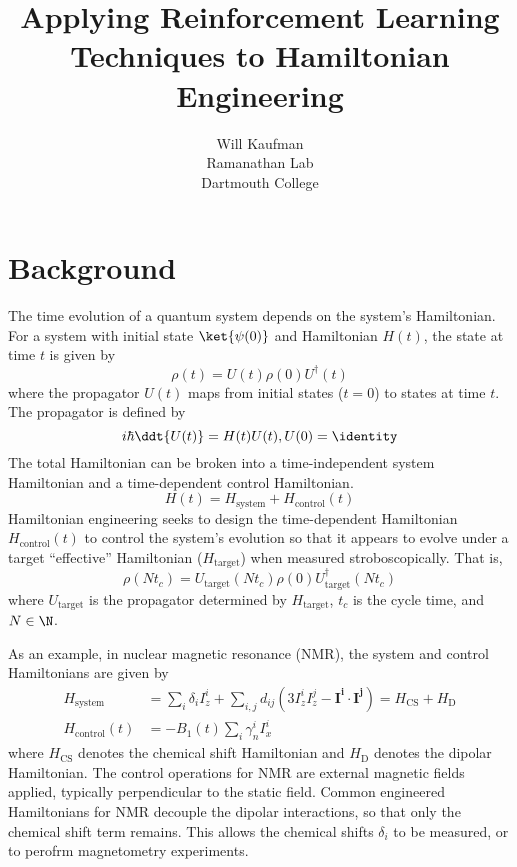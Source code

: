 \documentclass{article}
\title{Applying Reinforcement Learning Techniques to Hamiltonian Engineering}
\author{Will Kaufman \\ Ramanathan Lab \\ Dartmouth College}
\begin{document}
\maketitle

\section{Background}


The time evolution of a quantum system depends on the system's Hamiltonian. For a system with initial state $\ket{\psi(0)}$ and Hamiltonian $H(t)$, the state at time $t$ is given by
\[
\rho(t) = U(t)\rho(0)U^\dagger(t)
\]
where the propagator $U(t)$ maps from initial states ($t=0$) to states at time $t$. The propagator is defined by
\begin{equation}
    i\hbar \ddt{U(t)} = H(t) U(t), U(0) = \identity
\end{equation}
The total Hamiltonian can be broken into a time-independent system Hamiltonian and a time-dependent control Hamiltonian.
\begin{equation}
    H(t) = H_\text{system} + H_\text{control}(t)
\end{equation}
Hamiltonian engineering seeks to design the time-dependent Hamiltonian $H_\text{control}(t)$ to control the system's evolution so that it appears to evolve under a target ``effective'' Hamiltonian ($H_\text{target}$) when measured stroboscopically. That is,
\begin{equation}\label{eq:strob_measure}
    \rho(Nt_c) = U_\text{target}(Nt_c) \rho(0) U_\text{target}^\dagger(Nt_c)
\end{equation}
where $U_\text{target}$ is the propagator determined by $H_\text{target}$, $t_c$ is the cycle time, and $N \in \N$.

As an example, in nuclear magnetic resonance (NMR), the system and control Hamiltonians are given by
\begin{align}\label{eq:ham_spin}
    H_\text{system} &= \sum_i \delta_i I_z^i + \sum_{i,j} d_{ij} \left( 3I_z^iI_z^j - \mathbf{I^i} \cdot \mathbf{I^j} \right)
    = H_\text{CS} + H_\text{D} \\
    H_\text{control}(t) &= -B_1(t) \sum_i \gamma_n^i I_x^i
\end{align}
where $H_\text{CS}$ denotes the chemical shift Hamiltonian and $H_\text{D}$ denotes the dipolar Hamiltonian.
The control operations for NMR are external magnetic fields applied, typically perpendicular to the static field.
Common engineered Hamiltonians for NMR decouple the dipolar interactions, so that only the chemical shift term remains. This allows the chemical shifts $\delta_i$ to be measured, or to perofrm magnetometry experiments.
\end{document}
